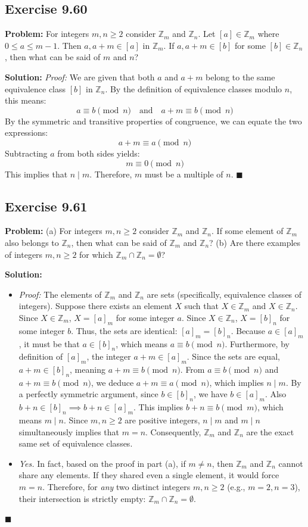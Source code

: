 \documentclass[11pt, a4paper]{article}
\theoremstyle{definition}
\theoremstyle{remark}
\newcommand{\Z}{\mathbb{Z}}
\begin{document}
\subsection{Exercise 9.60}
\textbf{Problem:} For integers $m, n \ge 2$ consider $\Z_m$ and $\Z_n$. Let $[a] \in \Z_m$ where $0 \le a \le m-1$. Then $a, a+m \in [a]$ in $\Z_m$. If $a, a+m \in [b]$ for some $[b] \in \Z_n$, then what can be said of $m$ and $n$?

\textbf{Solution:}
\textit{Proof:} We are given that both $a$ and $a+m$ belong to the same equivalence class $[b]$ in $\Z_n$. 
By the definition of equivalence classes modulo $n$, this means:
\[
a \equiv b \pmod n \quad \text{and} \quad a+m \equiv b \pmod n
\]
By the symmetric and transitive properties of congruence, we can equate the two expressions:
\[
a+m \equiv a \pmod n
\]
Subtracting $a$ from both sides yields:
\[
m \equiv 0 \pmod n
\]
This implies that $n \mid m$. Therefore, $m$ must be a multiple of $n$.
\hfill $\blacksquare$

\subsection{Exercise 9.61}
\textbf{Problem:} 
(a) For integers $m, n \ge 2$ consider $\Z_m$ and $\Z_n$. If some element of $\Z_m$ also belongs to $\Z_n$, then what can be said of $\Z_m$ and $\Z_n$?
(b) Are there examples of integers $m, n \ge 2$ for which $\Z_m \cap \Z_n = \emptyset$?

\textbf{Solution:}
\begin{itemize}
    \item[(a)] \textit{Proof:} The elements of $\Z_m$ and $\Z_n$ are sets (specifically, equivalence classes of integers). Suppose there exists an element $X$ such that $X \in \Z_m$ and $X \in \Z_n$. 
    Since $X \in \Z_m$, $X = [a]_m$ for some integer $a$. Since $X \in \Z_n$, $X = [b]_n$ for some integer $b$. Thus, the sets are identical: $[a]_m = [b]_n$.
    Because $a \in [a]_m$, it must be that $a \in [b]_n$, which means $a \equiv b \pmod n$. 
    Furthermore, by definition of $[a]_m$, the integer $a+m \in [a]_m$. Since the sets are equal, $a+m \in [b]_n$, meaning $a+m \equiv b \pmod n$. 
    From $a \equiv b \pmod n$ and $a+m \equiv b \pmod n$, we deduce $a+m \equiv a \pmod n$, which implies $n \mid m$.
    By a perfectly symmetric argument, since $b \in [b]_n$, we have $b \in [a]_m$. Also $b+n \in [b]_n \implies b+n \in [a]_m$. This implies $b+n \equiv b \pmod m$, which means $m \mid n$.
    Since $m, n \ge 2$ are positive integers, $n \mid m$ and $m \mid n$ simultaneously implies that $m = n$. 
    Consequently, $\Z_m$ and $\Z_n$ are the exact same set of equivalence classes.
    
    \item[(b)] \textit{Yes.} In fact, based on the proof in part (a), if $m \neq n$, then $\Z_m$ and $\Z_n$ cannot share any elements. If they shared even a single element, it would force $m = n$. Therefore, for \textit{any} two distinct integers $m, n \ge 2$ (e.g., $m=2, n=3$), their intersection is strictly empty: $\Z_m \cap \Z_n = \emptyset$.
\end{itemize}
\hfill $\blacksquare$
\end{document}
